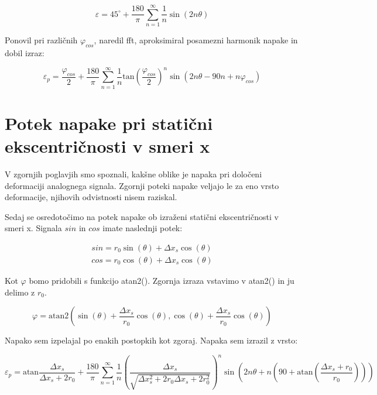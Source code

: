 \begin{equation}
\varepsilon = 45^\circ + \frac{180}{\pi}\sum_{n=1}^{\infty}\frac{1}{n} \sin (2n \theta)
\end{equation}


Ponovil pri različnih $\varphi_{cos}$, naredil fft, aproksimiral posamezni harmonik napake in dobil izraz:


\begin{equation}
\label{vrsta_faza_sin}
\varepsilon_p = \frac{\varphi_{cos}}{2} + \frac{180}{\pi}\sum_{n=1}^{\infty}\frac{1}{n} \mathrm{tan}(\frac{\varphi_{cos}}{2})^n \sin (2n \theta- 90 n+n \varphi_{cos})
\end{equation}




\newpage
\section{Potek napake pri statični ekscentričnosti v smeri x}

V zgornjih poglavjih smo spoznali, kakšne oblike je napaka pri določeni deformaciji analognega signala.
Zgornji poteki napake veljajo le za eno vrsto deformacije, njihovih odvistnosti nisem raziskal.

Sedaj se osredotočimo na potek napake ob izraženi statični ekscentričnosti v smeri x. Signala $sin$ in $cos$ imate naslednji potek:

\begin{eqnarray}
\label{xs_analit}
sin = r_0 \sin(\theta) + \Delta x_s \cos(\theta) \\
cos = r_0 \cos(\theta) + \Delta x_s \cos(\theta)
\end{eqnarray}

Kot $\varphi$ bomo pridobili s funkcijo atan2(). Zgornja izraza vstavimo v atan2() in ju delimo z $r_0$.
 
 \begin{equation}
 \varphi = \mathrm{atan2}(\sin(\theta) + \frac{\Delta x_s}{r_0} \cos(\theta),\cos(\theta) + \frac{\Delta x_s}{r_0} \cos(\theta))
 \end{equation}
 
 Napako sem izpelajal po enakih postopkih kot zgoraj.
 Napaka sem izrazil z vrsto:
 
 \begin{equation}
 \label{vrsta:xs}
 \varepsilon_p = \mathrm{atan}\frac{\Delta x _s}{\Delta x _s+2r_0}+\frac{180}{\pi} \sum_{n=1}^{\infty}\frac{1}{n} (\frac{\Delta x _s}{\sqrt{\Delta x _s^2+2 r_0 \Delta x _s+2r_0^2}})^n \sin (2n \theta+n (90+ \mathrm{ atan}(\frac{\Delta x _s+r_0}{r_0})))
 \end{equation}
 
